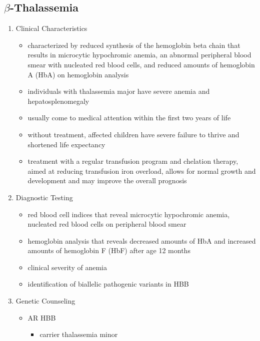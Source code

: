 \documentclass[12pt]{scrartcl}
\begin{document}
\subsection{\(\beta\)-Thalassemia}
\label{sec:org75b5873}
\begin{enumerate}
\item Clinical Characteristics
\label{sec:org9b2fc2b}
\begin{itemize}
\item characterized by reduced synthesis of the hemoglobin beta chain that
results in microcytic hypochromic anemia, an abnormal peripheral
blood smear with nucleated red blood cells, and reduced amounts of
hemoglobin A (HbA) on hemoglobin analysis
\item individuals with thalassemia major have severe anemia and
hepatosplenomegaly
\item usually come to medical attention within the first two years of
life
\item without treatment, affected children have severe failure to thrive
and shortened life expectancy
\item treatment with a regular transfusion program and chelation therapy,
aimed at reducing transfusion iron overload, allows for normal
growth and development and may improve the overall prognosis
\end{itemize}
\item Diagnostic Testing
\label{sec:org5c87130}
\begin{itemize}
\item red blood cell indices that reveal microcytic hypochromic anemia,
nucleated red blood cells on peripheral blood smear
\item hemoglobin analysis that reveals decreased amounts of HbA and
increased amounts of hemoglobin F (HbF) after age 12 months
\item clinical severity of anemia
\item identification of biallelic pathogenic variants in HBB
\end{itemize}
\item Genetic Counseling
\label{sec:org6c26215}
\begin{itemize}
\item AR HBB
\begin{itemize}
\item carrier thalassemia minor
\end{itemize}
\end{itemize}
\end{enumerate}
\end{document}
